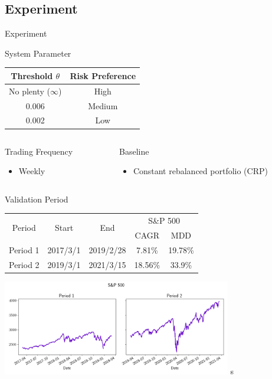 \subsection{Experiment}
\begin{frame}{Experiment}
\begin{block}{System Parameter}
    \centering
    \begin{tabular}{|c|c|}
        \hline
    Threshold $\theta$ & Risk Preference \\ \hline
    No plenty ($\infty$) & High \\ 
    0.006 & Medium      \\ 
    0.002 & Low      \\ \hline
    \end{tabular}
\end{block}
\begin{columns}[t]
    \begin{column}{0.45\textwidth}
    
    \begin{block}{Trading Frequency}
    \begin{itemize}
        \item  Weekly
    \end{itemize}
    \end{block}
    \end{column}
    \begin{column}{0.45\textwidth}
    \begin{block}{Baseline}
    \begin{itemize}
        \item  Constant rebalanced portfolio (CRP)
    \end{itemize}
    \end{block}
    \end{column}
\end{columns}



\end{frame}

\begin{frame}{Validation Period}
\begin{tabular}{||c|c|c|c|c||}
    \hline \hline
    \multirow{2}{*}{Period} &
    \multirow{2}{*}{Start} &
    \multirow{2}{*}{End} &
    \multicolumn{2}{c||}{S\&P 500} \\ 
    \cline{4-5} &{} &{} & CAGR & MDD \\ \hline \hline
    Period 1 & 2017/3/1 & 2019/2/28 & 7.81\% & 19.78\% \\ \hline
    Period 2 & 2019/3/1 & 2021/3/15 & 18.56\% & 33.9\% \\    
    \hline \hline
    \end{tabular}
      \centering
    \includegraphics[width=10cm]{images/sp500.png}
s
\end{frame}


